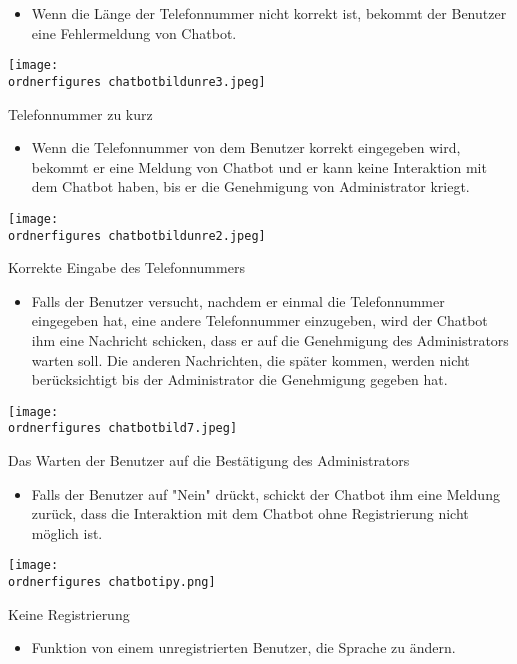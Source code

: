 \begin{itemize}
	\item Wenn die L\"ange der Telefonnummer nicht korrekt ist, bekommt der Benutzer eine Fehlermeldung von Chatbot.
\end{itemize}
\begin{center}
	\captionsetup{type=figure}
	\texttt{[image: \\ordnerfigures chatbotbildunre3.jpeg]}
	\caption{Telefonnummer zu kurz}
	\label{fig:crboregistrfds}
\end{center}
\begin{itemize}
	\item Wenn die Telefonnummer von dem Benutzer korrekt eingegeben wird, bekommt er eine Meldung von Chatbot und er kann keine Interaktion mit dem Chatbot haben, bis er die Genehmigung von Administrator kriegt.
\end{itemize}
\begin{center}
	\captionsetup{type=figure}
	\texttt{[image: \\ordnerfigures chatbotbildunre2.jpeg]}
	\caption{Korrekte Eingabe des Telefonnummers}
	\label{fig:crboreistrfds}
\end{center}
\begin{itemize}
	\item Falls der Benutzer versucht, nachdem er einmal die Telefonnummer eingegeben hat, eine andere Telefonnummer einzugeben, wird der Chatbot ihm eine Nachricht schicken, dass er auf die Genehmigung des Administrators warten soll. Die anderen Nachrichten, die später kommen, werden nicht berücksichtigt bis der Administrator die Genehmigung gegeben hat.
\end{itemize}
\begin{center}
	\captionsetup{type=figure}
	\texttt{[image: \\ordnerfigures chatbotbild7.jpeg]}
	\caption{Das Warten der Benutzer auf die Bestätigung des Administrators}
	\label{fig:chat232bo53}
\end{center}
\begin{itemize}
	\item Falls der Benutzer auf "Nein" dr\"uckt, schickt der Chatbot ihm eine Meldung zur\"uck, dass die Interaktion mit dem Chatbot ohne Registrierung nicht m\"oglich ist.
\end{itemize}
\begin{center}
	\captionsetup{type=figure}
	\texttt{[image: \\ordnerfigures chatbotipy.png]}
	\caption{Keine Registrierung}
	\label{fig:chatffd3}
\end{center}
\newpage
\begin{itemize}
	\item Funktion von einem unregistrierten Benutzer, die Sprache zu \"andern.
\end{itemize}
